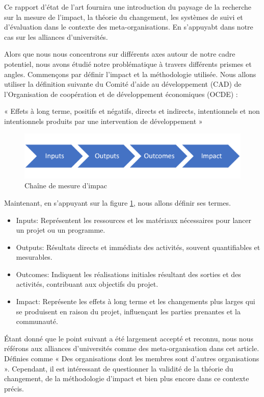 Ce rapport d'état de l'art fournira une introduction du paysage de la recherche sur la mesure de l'impact, la théorie du changement, les systèmes de suivi et d'évaluation dans le contexte des meta-organisations. En s'appuyabt dans notre cas sur les alliances d'universités. 

Alors que nous nous concentrons sur différents axes autour de notre cadre potentiel, nous avons étudié notre problématique à travers différents prismes et angles. 
Commençons par définir l'impact et la méthodologie utilisée. Nous allons utiliser la définition suivante du Comité d'aide au développement (CAD) de l'Organisation de coopération et de développement économiques (OCDE) :

« Effets à long terme, positifs et négatifs, directs et indirects, intentionnels et non intentionnels produits par une intervention de développement »\cite{oecd_quality_2010}

\begin{figure}
    \centering
    \includegraphics[width=1\linewidth]{Modele_Latex_CNRIUT2025//images/impact-chain.png}
    \caption{Chaîne de mesure d’impac\cite{stein_understanding_2012}}
    \label{fig:impact-chain}
\end{figure}
Maintenant, en s'appuyant sur la figure \ref{fig:impact-chain}, nous allons définir ses termes.
\begin{itemize}
    \item Inputs: Représentent les ressources et les matériaux nécessaires pour lancer un projet ou un programme.
    \item Outputs: Résultats directs et immédiats des activités, souvent quantifiables et mesurables.
    \item Outcomes: Indiquent les réalisations initiales résultant des sorties et des activités, contribuant aux objectifs du projet.
    \item Impact: Représente les effets à long terme et les changements plus larges qui se produisent en raison du projet, influençant les parties prenantes et la communauté.
\end{itemize}

Étant donné que le point suivant a été largement accepté et reconnu, nous nous référons aux alliances d'universités comme des meta-organisation dans cet article. Définies comme « Des organisations dont les membres sont d'autres organisations »\cite{ahrne_organizations_2005}. Cependant, il est intéressant de questionner la validité de la théorie du changement, de la méthodologie d'impact et bien plus encore dans ce contexte précis.

